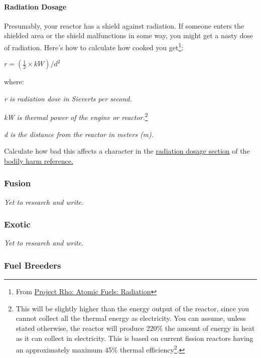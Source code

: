 \paragraph{Radiation Dosage}Presumably, your reactor has a shield against radiation. If someone enters the shielded area or the shield malfunctions in some way, you might get a nasty dose of radiation. Here's how to calculate how cooked you get\footnote{From \href{http://www.projectrho.com/public_html/rocket/atomicfuel.php}{Project Rho: Atomic Fuels: Radiation}}:

$r = (\frac{1}{2} \times kW) / d^{2}$

\par
where:
\par
\textit{r is radiation dose in Sieverts per second.}
\par
\textit{kW is thermal power of the engine or reactor.}\footnote{This will be slightly higher than the energy output of the reactor, since you cannot collect all the thermal energy as electricity. You can assume, unless stated otherwise, the reactor will produce 220\% the amount of energy in heat as it can collect in electricity. This is based on current fission reactors having an approximately maximum 45\% thermal efficiency\footnote{Based on nuclear-power.net: \href{https://www.nuclear-power.net/nuclear-engineering/thermodynamics/laws-of-thermodynamics/thermal-efficiency/thermal-efficiency-of-nuclear-power-plants/}{Thermal Efficiency of Nuclear Power Plants}}.}
\par
\textit{d is the distance from the reactor in meters (m).}

\par
Calculate how bad this affects a character in the \hyperlink{harm_radiation}{radiation dosage section} of the \hyperlink{harm}{bodily harm reference.}

\subsubsection{Fusion}

\textit{Yet to research and write.}

\subsubsection{Exotic}

\textit{Yet to research and write.}

\subsubsection{Fuel Breeders}

